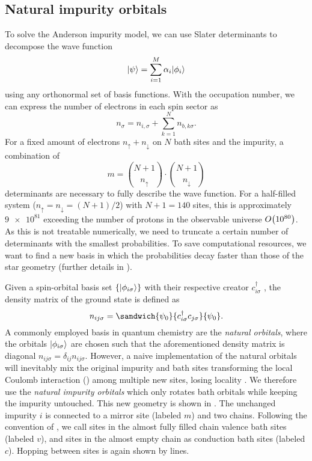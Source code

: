 \subsection{Natural impurity orbitals}
\label{sec:natural-impurity-orbitals}

To solve the Anderson impurity model,
we can use Slater determinants to decompose the wave function
\begin{equation}
    \lvert\psi\rangle = \sum_{i=1}^M \alpha_i \lvert\phi_i\rangle
\end{equation}
using any orthonormal set of basis functions.
With the occupation number,
we can express the number of electrons in each spin sector as
\begin{equation}
    n_\sigma = n_{i,\sigma} + \sum_{k=1}^N n_{b,k\sigma}.
\end{equation}
For a fixed amount of electrons $n_\uparrow + n_\downarrow$ on $N$ bath sites and the impurity,
a combination of
\begin{equation}
    m = \binom{N+1}{n_\uparrow} \cdot \binom{N+1}{n_\downarrow}
\end{equation}
determinants are necessary to fully describe the wave function.
For a half-filled system ($n_\uparrow = n_\downarrow = (N+1)/2$)
with $N+1=140$ sites, this is approximately $\num{9e81}$
exceeding the number of protons in the observable universe $O\!\left(\num{e80}\right)$. %
As this is not treatable numerically,
we need to truncate a certain number of determinants with the smallest probabilities.
To save computational resources,
we want to find a new basis in which the probabilities decay faster than those of the star geometry
(further details in \cite{Bi2019}).

Given a spin-orbital basis set $\{\lvert\phi_{i\sigma}\rangle\}$
with their respective creator $c_{i\sigma}^\dag$ \cite{Bi2019},
the density matrix of the ground state is defined as
\begin{equation}
    n_{ij\sigma} = \sandwich{\psi_0}{c_{i\sigma}^\dag c_{j\sigma}}{\psi_0}.
\end{equation}
A commonly employed basis in quantum chemistry are the \emph{natural orbitals},
where the orbitals $\lvert\phi_{i\sigma}\rangle$ are chosen such that
the aforementioned density matrix is diagonal $n_{ij\sigma} = \delta_{ij}n_{ij\sigma}$.
However,
a naive implementation of the natural orbitals will inevitably mix the original impurity
and bath sites transforming the local Coulomb interaction ()
among multiple new sites,
losing locality \cite{Lu2014,Lu2019}.
We therefore use the \emph{natural impurity orbitals}
which only rotates bath orbitals while keeping the impurity untouched.
This new geometry is shown in .
The unchanged impurity $i$ is connected to a mirror site (labeled $m$) and two chains.
Following the convention of \cite{Lu2014,Lu2019},
we call sites in the almost fully filled chain valence bath sites (labeled $v$),
and sites in the almost empty chain as conduction bath sites (labeled $c$).
Hopping between sites is again shown by lines.

